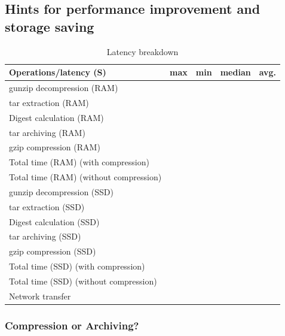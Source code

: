 \subsection{Hints for performance improvement and storage saving}

\begin{table} 
	\centering 
	\scriptsize  
	\caption{Latency breakdown} \label{tbl:redundant_ratio} 
	\begin{tabular}{|l|l|l|l|l|}%
		\hline 
		Operations/latency (S) & max & min & median & avg.\\
		\hline
		 gunzip decompression (RAM) &   &   &    &  \\
 		\hline
 		tar extraction (RAM) &   &   &    &  \\
		\hline
		Digest calculation (RAM) &  &  & & \\
		\hline
		tar archiving (RAM)  &  &  & &\\
		\hline
		gzip compression (RAM) & &  &  & \\
		\hline
		Total time (RAM) (with compression) & & & & \\
		\hline
		Total time (RAM) (without compression) & & & & \\
		\hline
 		\hline
 		gunzip decompression (SSD) &   &   &    &  \\
 		\hline
 		tar extraction (SSD) &   &   &    &  \\
		\hline
		Digest calculation (SSD) &  &  & & \\
		\hline
		tar archiving (SSD) &  &  & & \\
		\hline
		gzip compression (SSD) & &  &  & \\
		\hline		 
		Total time (SSD) (with compression) & & & & \\
		\hline
		Total time (SSD) (without compression) & & & & \\
		\hline
		\hline
		Network transfer & & & & \\
		\hline 	
	\end{tabular} 
\end{table} 

\subsubsection{Compression or Archiving?} 

